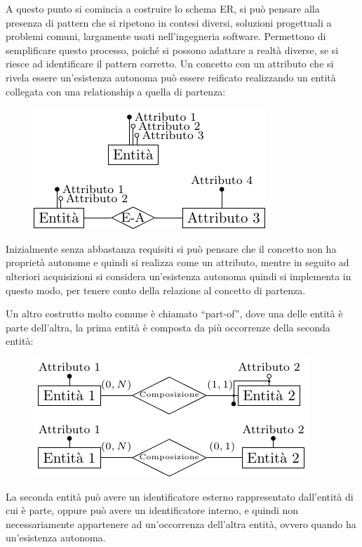 \documentclass{article}
\numberwithin{equation}{subsection}
\begin{document}
A questo punto si comincia a costruire lo schema ER, si può pensare alla presenza di pattern che si ripetono in contesi diversi, soluzioni progettuali a problemi comuni, largamente usati nell'ingegneria software. 
Permettono di semplificare questo processo, poiché si possono adattare a realtà diverse, se si riesce ad identificare il pattern corretto. 
Un concetto con un attributo che si rivela essere un'esistenza autonoma può essere reificato realizzando un entità collegata con una relationship a quella di partenza:
\begin{figure}[H]%
    \centering%
    \includegraphics[scale=1.25]{reificazione_attributo.pdf}%
\end{figure}

Inizialmente senza abbastanza requisiti si può pensare che il concetto non ha proprietà autonome e quindi si realizza come un attributo, mentre in seguito ad ulteriori acquisizioni si 
considera un'esistenza autonoma quindi si implementa in questo modo, per tenere conto della relazione al concetto di partenza. 


Un altro costrutto molto comune è chiamato ``part-of'', dove una delle entità è parte dell'altra, la prima entità è composta da più occorrenze della seconda entità:
\begin{figure}[H]%
    \centering%
    \includegraphics[scale=1.25]{part_of.pdf}%
\end{figure}

La seconda entità può avere un identificatore esterno rappresentato dall'entità di cui è parte, oppure può avere un identificatore interno, e quindi non necessariamente appartenere ad un'occorrenza 
dell'altra entità, ovvero quando ha un'esistenza autonoma. 
\end{document}
